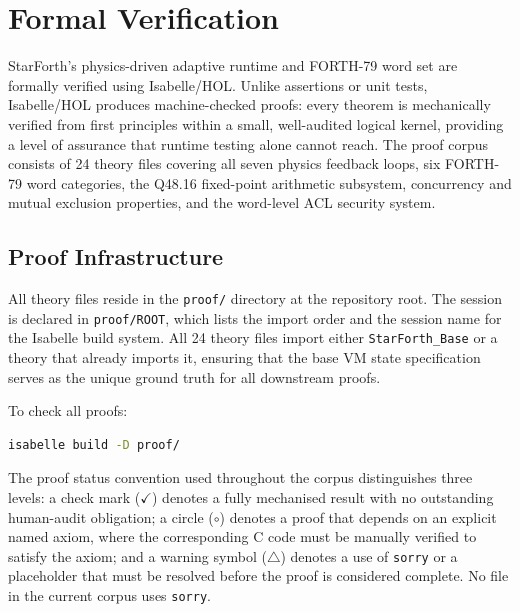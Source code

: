 
\chapter{Formal Verification}
\label{vol1:chap:proofs}

StarForth's physics-driven adaptive runtime and FORTH-79 word set are formally
verified using Isabelle/HOL. Unlike assertions or unit tests, Isabelle/HOL
produces machine-checked proofs: every theorem is mechanically verified from
first principles within a small, well-audited logical kernel, providing a level
of assurance that runtime testing alone cannot reach. The proof corpus consists
of 24 theory files covering all seven physics feedback loops, six FORTH-79 word
categories, the Q48.16 fixed-point arithmetic subsystem, concurrency and mutual
exclusion properties, and the word-level ACL security system.

\section{Proof Infrastructure}
\label{vol1:sec:proofs:infra}

All theory files reside in the \texttt{proof/} directory at the repository
root. The session is declared in \texttt{proof/ROOT}, which lists the import
order and the session name for the Isabelle build system. All 24 theory files
import either \texttt{StarForth\_Base} or a theory that already imports it,
ensuring that the base VM state specification serves as the unique ground truth
for all downstream proofs.

To check all proofs:
\begin{lstlisting}[language=bash]
isabelle build -D proof/
\end{lstlisting}


The proof status convention used throughout the corpus distinguishes three
levels: a check mark ($\checkmark$) denotes a fully mechanised result with no
outstanding human-audit obligation; a circle ($\circ$) denotes a proof that
depends on an explicit named axiom, where the corresponding C code must be
manually verified to satisfy the axiom; and a warning symbol ($\triangle$)
denotes a use of \texttt{sorry} or a placeholder that must be resolved before
the proof is considered complete. No file in the current corpus uses
\texttt{sorry}.

